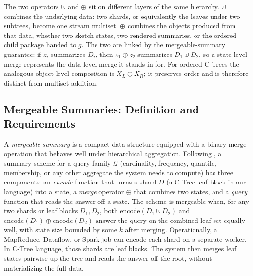 The two operators \(\uplus\) and \(\oplus\) sit on different layers of
the same hierarchy. \(\uplus\) combines the underlying data: two
shards, or equivalently the leaves under two subtrees, become one
stream multiset. \(\oplus\) combines the objects produced from that
data, whether two sketch states, two rendered summaries, or the
ordered child package handed to \(g\). The two are linked by the
mergeable-summary guarantee: if \(z_i\) summarizes \(D_i\), then
\(z_1\oplus z_2\) summarizes \(D_1\uplus D_2\), so a state-level merge
represents the data-level merge it stands in for. For ordered C-Trees
the analogous object-level composition is \(X_L\oplus X_R\); it
preserves order and is therefore distinct from multiset addition.

\subsection{Mergeable Summaries: Definition and Requirements}
\label{sec:v7-mergeable-pattern}

A \emph{mergeable summary} is a compact data structure equipped with a
binary merge operation that behaves well under hierarchical aggregation.
Following \citet{Agarwal2013MergeableTODS}, a summary scheme for a query
family \(\mathcal{Q}\) (cardinality, frequency, quantile, membership,
or any other aggregate the system needs to compute) has three
components: an \emph{encode} function that turns a shard \(D\) (a
C-Tree leaf block in our language) into a state, a \emph{merge}
operator \(\oplus\) that combines two states, and a \emph{query}
function that reads the answer off a state. The scheme is mergeable
when, for any two shards or leaf blocks \(D_1,D_2\), both
\(\mathrm{encode}(D_1\uplus D_2)\) and
\(\mathrm{encode}(D_1)\oplus\mathrm{encode}(D_2)\) answer the query on
the combined leaf set equally well, with state size bounded by some
\(k\) after merging. Operationally, a MapReduce, Dataflow, or Spark job
can encode each shard on a separate worker. In C-Tree language, those
shards are leaf blocks. The system then merges leaf states pairwise up
the tree and reads the answer off the root, without materializing the
full data.

